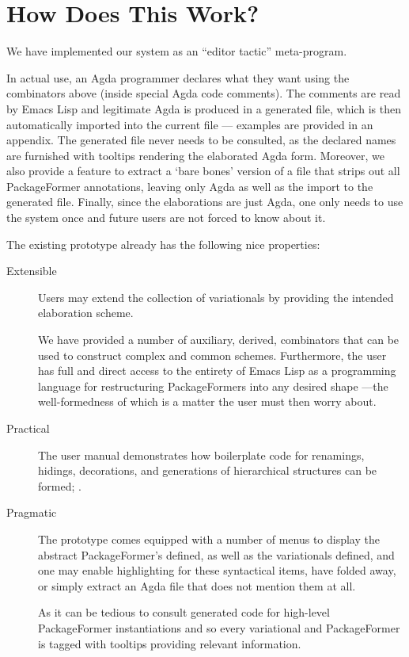 \documentclass[sigplan,screen]{acmart}
\begin{document}
\section{How Does This Work?}
\label{sec:org3843ed7}

We have implemented our system as an “editor tactic” meta-program.

In actual use, an Agda programmer declares what they want
using the combinators above (inside special Agda code comments).
The comments are read by Emacs Lisp and legitimate Agda is produced in a generated file, which is
then automatically imported into the current file --- examples are provided in an appendix.
The generated file never needs to be consulted,
as the declared names are furnished with tooltips rendering the elaborated
Agda form. Moreover, we also provide a feature to extract a ‘bare bones’ version
of a file that strips out all PackageFormer annotations, leaving only Agda
as well as the import to the generated file. Finally, since the elaborations are
just Agda, one only needs to use the system once and future users are
not forced to know about it.

The existing prototype already has the following nice properties:
\begin{description}
\item[{Extensible}] Users may extend the collection of variationals by providing the intended
elaboration scheme.

We have provided a number of auxiliary, derived, combinators
that can be used to construct complex and common schemes.
Furthermore, the user has full and direct access to the entirety of Emacs Lisp
as a programming language for restructuring PackageFormers into any desired shape
---the well-formedness of which is a matter the user must then worry about.

\item[{Practical}] The user manual demonstrates how boilerplate code for
            renamings, hidings, decorations, and generations
of hierarchical structures can be formed; \newline
\cite{tpc}.

\item[{Pragmatic}] The prototype comes equipped with a number of menus
to display the abstract PackageFormer's defined,
as well as the variationals defined, and one may
enable highlighting for these syntactical items, have
folded away, or simply extract an Agda file that does not mention
them at all.

As it can be tedious to consult generated code for high-level
PackageFormer instantiations and so every variational and PackageFormer
is tagged with tooltips providing relevant information.
\end{description}
\end{document}
